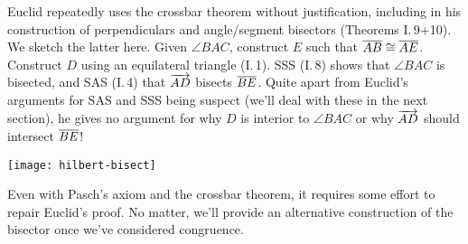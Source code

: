 

\begin{minipage}[t]{0.67\linewidth}\vspace{-8pt}
	Euclid repeatedly uses the crossbar theorem without justification, including in his construction of perpendiculars and angle/segment bisectors (Theorems I.\,9+10). We sketch the latter here.\smallbreak
	Given $\angle BAC$, construct $E$ such that $\overline{AB}\cong\overline{AE}$. Construct $D$ using an equilateral triangle (I.\,1). SSS (I.\,8) shows that $\angle BAC$ is bisected, and SAS (I.\,4) that $\overrightarrow{AD}$ bisects $\overline{BE}$.\smallbreak
	Quite apart from Euclid's arguments for SAS and SSS being suspect (we'll deal with these in the next section), he gives no argument for why $D$ is interior to $\angle BAC$ or why $\overrightarrow{AD}$ should intersect $\overline{BE}$!
\end{minipage}
\hfill
\begin{minipage}[t]{0.32\linewidth}\vspace{0pt}
	\flushright
	\texttt{[image: hilbert-bisect]}
\end{minipage}
\medbreak


Even with Pasch's axiom and the crossbar theorem, it requires some effort to repair Euclid's proof. No matter, we'll provide an alternative construction of the bisector once we've considered congruence.

\goodbreak


